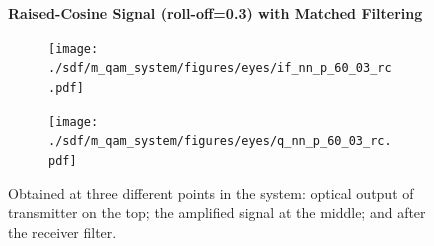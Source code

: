 \begin{figure}[H]
	
		\centering
	\textbf{Raised-Cosine Signal (roll-off=0.3) with Matched Filtering}
	\begin{minipage}{\linewidth}
		\centering
	\begin{subfigure}{.45\textwidth}
		\centering
		\texttt{[image: ./sdf/m\_qam\_system/figures/eyes/if\_nn\_p\_60\_03\_rc.pdf]}
	\end{subfigure}
	\begin{subfigure}{.45\textwidth}
		\centering
		\texttt{[image: ./sdf/m\_qam\_system/figures/eyes/q\_nn\_p\_60\_03\_rc.pdf]}
	\end{subfigure}
	
	\caption{
		Obtained at
		three different points in the system: optical output of transmitter on the top;
		the amplified signal at the middle; and
		after the receiver filter.
		\label{fig:eyes_nn_rc_03}}
	\end{minipage}
\end{figure}

